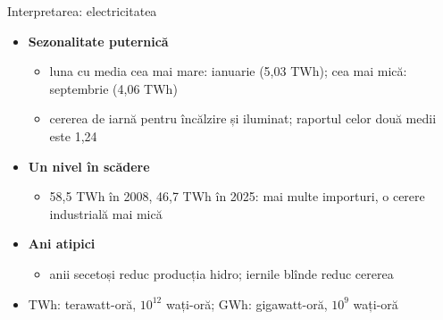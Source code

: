 \begin{frame}{Interpretarea: electricitatea}
\itemsize{\small}
\begin{itemize}
    \item \textbf{Sezonalitate puternică}
    \begin{itemize}
        \item luna cu media cea mai mare: ianuarie (5{,}03 TWh); cea mai mică: septembrie (4{,}06 TWh)
        \item cererea de iarnă pentru încălzire și iluminat; raportul celor două medii este 1{,}24
    \end{itemize}
    \item \textbf{Un nivel în scădere}
    \begin{itemize}
        \item 58{,}5 TWh în 2008, 46{,}7 TWh în 2025: mai multe importuri, o cerere industrială mai mică
    \end{itemize}
    \item \textbf{Ani atipici}
    \begin{itemize}
        \item anii secetoși reduc producția hidro; iernile blînde reduc cererea
    \end{itemize}
    \item TWh: terawatt-oră, $10^{12}$ wați-oră; GWh: gigawatt-oră, $10^{9}$ wați-oră
\end{itemize}
\end{frame}

